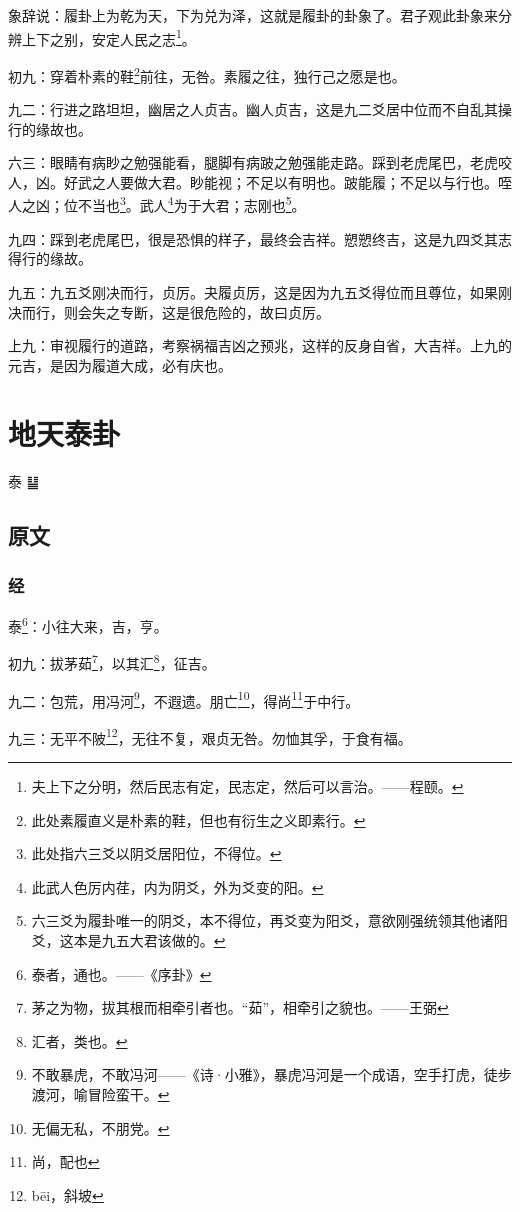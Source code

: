 \documentclass[12pt,oneside]{book}
\begin{document}
象辞说：履卦上为乾为天，下为兑为泽，这就是履卦的卦象了。君子观此卦象来分辨上下之别，安定人民之志\footnote{夫上下之分明，然后民志有定，民志定，然后可以言治。——程颐。}。

初九：穿着朴素的鞋\footnote{此处素履直义是朴素的鞋，但也有衍生之义即素行。}前往，无咎。素履之往，独行己之愿是也。

九二：行进之路坦坦，幽居之人贞吉。幽人贞吉，这是九二爻居中位而不自乱其操行的缘故也。

六三：眼睛有病眇之勉强能看，腿脚有病跛之勉强能走路。踩到老虎尾巴，老虎咬人，凶。好武之人要做大君。眇能视；不足以有明也。跛能履；不足以与行也。咥人之凶；位不当也\footnote{此处指六三爻以阴爻居阳位，不得位。}。武人\footnote{此武人色厉内荏，内为阴爻，外为爻变的阳。}为于大君；志刚也\footnote{六三爻为履卦唯一的阴爻，本不得位，再爻变为阳爻，意欲刚强统领其他诸阳爻，这本是九五大君该做的。}。

九四：踩到老虎尾巴，很是恐惧的样子，最终会吉祥。愬愬终吉，这是九四爻其志得行的缘故。

九五：九五爻刚决而行，贞厉。夬履贞厉，这是因为九五爻得位而且尊位，如果刚决而行，则会失之专断，这是很危险的，故曰贞厉。

上九：审视履行的道路，考察祸福吉凶之预兆，这样的反身自省，大吉祥。上九的元吉，是因为履道大成，必有庆也。



\chapter{地天泰卦}
泰 {\Large ䷊}

\section{原文}

\subsection{经}
泰\footnote{泰者，通也。——《序卦》}：小往大来，吉，亨。

初九：拔茅茹\footnote{茅之为物，拔其根而相牵引者也。“茹”，相牵引之貌也。——王弼}，以其汇\footnote{汇者，类也。}，征吉。

九二：包荒，用冯河\footnote{不敢暴虎，不敢冯河——《诗·小雅》，暴虎冯河是一个成语，空手打虎，徒步渡河，喻冒险蛮干。}，不遐遗。朋亡\footnote{无偏无私，不朋党。}，得尚\footnote{尚，配也}于中行。

九三：无平不陂\footnote{bēi，斜坡}，无往不复，艰贞无咎。勿恤其孚，于食有福。
\end{document}
